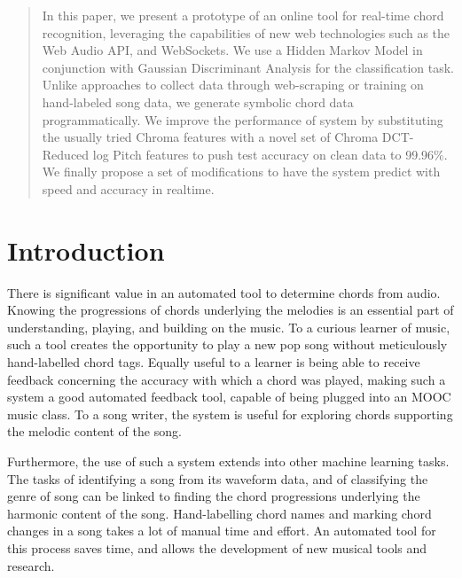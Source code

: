 \documentclass{article}
\begin{document}

\begin{abstract}
In this paper, we present a prototype of an online tool for real-time chord
recognition, leveraging the capabilities of new web technologies such as the Web
Audio API, and WebSockets. We use a Hidden Markov Model in conjunction with
Gaussian Discriminant Analysis for the classification task. Unlike approaches to
collect data through web-scraping or training on hand-labeled song data, we
generate symbolic chord data programmatically. We improve the performance of
system by substituting the usually tried Chroma features with a novel set of
Chroma DCT-Reduced log Pitch features to push test accuracy on clean data to
99.96\%. We finally propose a set of modifications to have the system predict
with speed and accuracy in realtime.
\end{abstract}

\section{Introduction}
\label{intro}
There is significant value in an automated tool to determine chords from audio.
Knowing the progressions of chords underlying the melodies is an essential part
of understanding, playing, and building on the music. To a curious learner of
music, such a tool creates the opportunity to play a new pop song without
meticulously hand-labelled chord tags. Equally useful to a learner is being able
to receive feedback concerning the accuracy with which a chord was played,
making such a system a good automated feedback tool, capable of being plugged
into an MOOC music class. To a song writer, the system is useful for exploring
chords supporting the melodic content of the song.

Furthermore, the use of such a system extends into other machine learning tasks.
The tasks of identifying a song from its waveform data, and of classifying the
genre of song can be linked to finding the chord progressions underlying the
harmonic content of the song. Hand-labelling chord names and marking chord
changes in a song takes a lot of manual time and effort. An automated tool for
this process saves time, and allows the development of new musical tools and
research.
\end{document}
